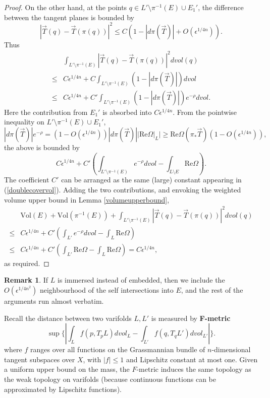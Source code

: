 \documentclass[a4paper]{article}
\theoremstyle{definition}
\newtheorem{rmk}{Remark}
\begin{document}
\begin{proof}
On the other hand, at the points  $q\in L'\setminus \pi^{-1}(E)\cup E_1'$, the difference between the tangent planes is bounded by
\[
|\vec{T}(q)- \vec{T}(\pi(q))|^2 \leq C (1- |d\pi(\vec{T})| + O(\epsilon^{1/4n} )).
\]
Thus
\[
\begin{split}
& \int_{ L'\setminus \pi^{-1}(E)} |\vec{T}(q)- \vec{T}(\pi(q))|^2 dvol(q)  
\\
 \leq & C\epsilon^{1/4n} + C\int_{L'\setminus \pi^{-1}(E)}  (1- |d\pi(\vec{T})|) dvol
\\
\leq & C\epsilon^{1/4n} + C'\int_{L'\setminus \pi^{-1}(E)}  (1- |d\pi(\vec{T})|) e^{-\rho}dvol.
\end{split}
\]
Here the contribution from $E_1'$ is absorbed into $C\epsilon^{1/4n}$. 
From the pointwise inequality on $L'\setminus \pi^{-1}(E)\cup E_1'$,
\[
|d\pi(\vec{T})|e^{-\rho}=(1- O(\epsilon^{1/4n})) |d\pi(\vec{T})| |\text{Re}\Omega|_L|\geq  \text{Re}\Omega(\pi_*\vec{T})  (1- O(\epsilon^{1/4n})) ,
\]
the above is bounded by
\[
C\epsilon^{1/4n} + C'(\int_{L'\setminus \pi^{-1}(E)} e^{-\rho}dvol  - \int_{L\setminus E} \text{Re} \Omega).
\]
The coefficient $C'$ can be arranged as the same (large) constant appearing in (\ref{doublecovervol}). Adding the two contributions, and envoking the weighted volume upper bound in Lemma \ref{volumeupperbound},
\[
\begin{split}
& \text{Vol}(E)+ \text{Vol}(\pi^{-1}(E)) +\int_{ L'\setminus \pi^{-1}(E)} |\vec{T}(q)- \vec{T}(\pi(q))|^2 dvol(q) 
\\
\leq & C\epsilon^{1/4n} + C'(\int_{L'} e^{-\rho}dvol  - \int_{L} \text{Re} \Omega)
\\
\leq & C\epsilon^{1/4n} + C'(\int_{L'} \text{Re}\Omega  - \int_{L} \text{Re} \Omega)= C\epsilon^{1/4n},
\end{split}
\]
as required.
\end{proof}

\begin{rmk}
	If $L$ is immersed instead of embedded, then we include the $O(\epsilon^{1/4n^2})$ neighbourhood of the self intersections into $E$, and the rest of the arguments run almost verbatim.
\end{rmk}





Recall the distance between two varifolds $L,L'$ is measured by \textbf{F-metric}
\[
\sup \{  |\int_L f(p, T_p L) dvol_L  -\int_{L'} f(q, T_q L' ) dvol_{L'}  |   \}.
\]
where $f$ ranges over all functions on the Grassmannian bundle of $n$-dimensional tangent subspaces over $X$, with $|f|\leq 1$ and Lipschitz constant at most one. Given a uniform upper bound on the mass, the $F$-metric induces the same topology as the weak topology on varifolds (because continuous functions can be approximated by Lipschitz functions).
\end{document}
